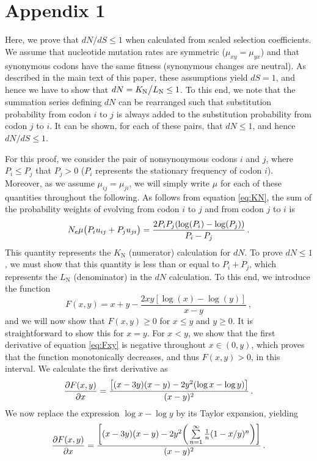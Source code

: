 \documentclass[11pt]{article}
\begin{document}
\section*{Appendix 1}
Here, we prove that $dN/dS \leq 1$ when calculated from scaled selection coefficients. We assume that nucleotide mutation rates are symmetric ($\mu_{xy} = \mu_{yx}$) and that synonymous codons have the same fitness (synonymous changes are neutral). As described in the main text of this paper, these assumptions yield $dS = 1$, and hence we have to show that $dN = K_\text{N}\big{/}L_\text{N} \leq 1$. To this end, we note that the summation series defining $dN$ can be rearranged such that substitution probability from codon $i$ to $j$ is always added to the substitution probability from codon $j$ to $i$. It can be shown, for each of these pairs, that $dN \leq 1$, and hence $dN/dS \leq 1$.

For this proof, we consider the pair of nonsynonymous codons $i$ and $j$, where $P_i \leq P_j$ that $P_j > 0$ ($P_i$ represents the stationary frequency of codon $i$). Moreover, as we assume $\mu_{ij} = \mu_{ji}$, we will simply write $\mu$ for each of these quantities throughout the following. As follows from equation \eqref{eq:KN}, the sum of the probability weights of evolving from codon $i$ to $j$ and from codon $j$ to $i$ is
\begin{equation}
N_e\mu \big{(} P_iu_{ij} + P_ju_{ji} \big{)} = \frac{2P_iP_j(\log(P_i) - \log(P_j))}{P_i - P_j} \,.
\end{equation}
This quantity represents the $K_\text{N}$ (numerator) calculation for $dN$. To prove $dN \leq 1$, we must show that this quantity is less than or equal to $P_i + P_j$, which represents the $L_\text{N}$ (denominator) in the $dN$ calculation. To this end, we introduce the function 
\begin{equation}\label{eq:Fxy}
F(x,y) = x + y - \frac{2xy[\log(x) - \log(y)]}{x - y} \,,
\end{equation}
and we will now show that $F(x,y) \geq 0$ for $x \leq y$ and $y \geq 0 $. It is straightforward to show this for $x=y$. For $x < y$, we show that the first derivative of equation \eqref{eq:Fxy} is negative throughout $x \in (0,y)$, which proves that the function monotonically decreases, and thus $F(x,y) > 0$, in this interval. We calculate the first derivative as 
\begin{equation}
\frac{\partial{F(x,y)}}{\partial{x}} = \frac{\big{[} (x-3y)(x-y) - 2y^2(\log{x} - \log{y}) \big{]}}{(x-y)^2} \,.
\end{equation}
We now replace the expression $\log{x} - \log{y}$ by its Taylor expansion, yielding
\begin{equation}\label{eq:expand}
	\frac{\partial{F(x,y)}}{\partial{x}} = 
	\frac{ \bigg{[} (x-3y)(x-y) - 2y^2\bigg{(}\sum\limits_{n=1}^\infty \frac{1}{n} (1-x/y)^n\bigg{)} \bigg{]}}{(x-y)^2} \,.
\end{equation}
\end{document}

